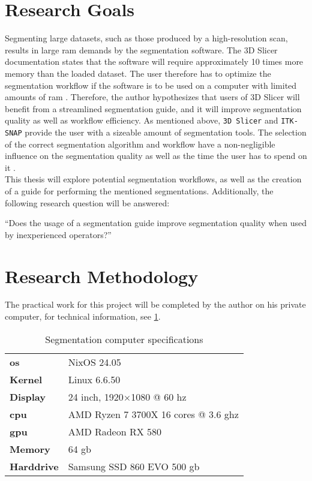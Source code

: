 \section{Research Goals}\label{s:introduction-researchgoals}
Segmenting large datasets, such as those produced by a high-resolution \mct\space scan, results in large \acrfull{ram} demands by the segmentation software.
The 3D Slicer documentation states that the software will require approximately 10 times more memory than the loaded dataset.
The user therefore has to optimize the segmentation workflow if the software is to be used on a computer with limited amounts of \acrshort{ram} \cite{slicercommunity3DSlicerImage2022,fedorov3DSlicerImage2012}.
Therefore, the author hypothesizes that users of 3D Slicer will benefit from a streamlined segmentation guide, and it will improve segmentation quality as well as workflow efficiency.
As mentioned above, \texttt{3D Slicer} and \texttt{ITK-SNAP} provide the user with a sizeable amount of segmentation tools.
The selection of the correct segmentation algorithm and workflow have a non-negligible influence on the segmentation quality as well as the time the user has to spend on it \cite{liuSAMMSegmentAny2023}.\\
This thesis will explore potential segmentation workflows, as well as the creation of a guide for performing the mentioned segmentations.
Additionally, the following research question will be answered:
\begin{displayquote}
	``Does the usage of a segmentation guide improve segmentation quality when used by inexperienced operators?''
\end{displayquote}


\section{Research Methodology}\label{s:introduction-researchmethodology}
The practical work for this project will be completed by the author on his private computer, for technical information, see \cref{t:computer-specs}.
\begin{table}[ht]
	\centering
	\begin{tabular}{l l}
		\textbf{\acrshort{os}}  & NixOS 24.05                                     \\
		\textbf{Kernel}         & Linux 6.6.50                                    \\
		\textbf{Display}        & 24 inch, 1920$\times$1080 @ 60 \acrshort{hz}    \\
		\textbf{\acrshort{cpu}} & AMD Ryzen 7 3700X 16 cores @ 3.6 \acrshort{ghz} \\
		\textbf{\acrshort{gpu}} & AMD Radeon RX 580                               \\
		\textbf{Memory}         & 64 \acrshort{gb}                                \\
		\textbf{Harddrive}      & Samsung SSD 860 EVO 500 \acrshort{gb}
	\end{tabular}
	\caption{Segmentation computer specifications}\label{t:computer-specs}
\end{table}

